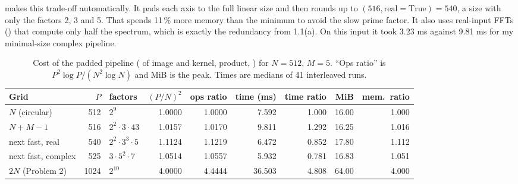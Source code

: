  makes this trade-off automatically. It pads
each axis to the full linear size and then rounds up to
$(516,\text{real}=\text{True})=540$, a size with only the
factors 2, 3 and 5. That spends 11\,\% more memory than the minimum to avoid the
slow prime factor. It also uses real-input FFTs () that compute only
half the spectrum, which is exactly the redundancy from 1.1(a). On this input it
took 3.23 ms against 9.81 ms for my minimal-size complex pipeline.

\begin{table}[H]
\centering
\begin{tabular}{lrlrrrrrr}
\toprule
Grid & $P$ & factors & $(P/N)^2$ & ops ratio & time (ms) & time ratio & MiB & mem.\ ratio\\
\midrule
$N$ (circular) & 512 & $2^9$ & 1.0000 & 1.0000 & 7.592 & 1.000 & 16.00 & 1.000\\
$N+M-1$ & 516 & $2^2\cdot3\cdot43$ & 1.0157 & 1.0170 & 9.811 & 1.292 & 16.25 & 1.016\\
next fast, real & 540 & $2^2\cdot3^3\cdot5$ & 1.1124 & 1.1219 & 6.472 & 0.852 & 17.80 & 1.112\\
next fast, complex & 525 & $3\cdot5^2\cdot7$ & 1.0514 & 1.0557 & 5.932 & 0.781 & 16.83 & 1.051\\
$2N$ (Problem 2) & 1024 & $2^{10}$ & 4.0000 & 4.4444 & 36.503 & 4.808 & 64.00 & 4.000\\
\bottomrule
\end{tabular}
\caption{Cost of the padded pipeline ( of image and kernel, product,
) for $N=512$, $M=5$. ``Ops ratio'' is $P^2\log P/(N^2\log N)$ and
MiB is the  peak. Times are medians of 41 interleaved runs.}
\label{tab:pad}
\end{table}
